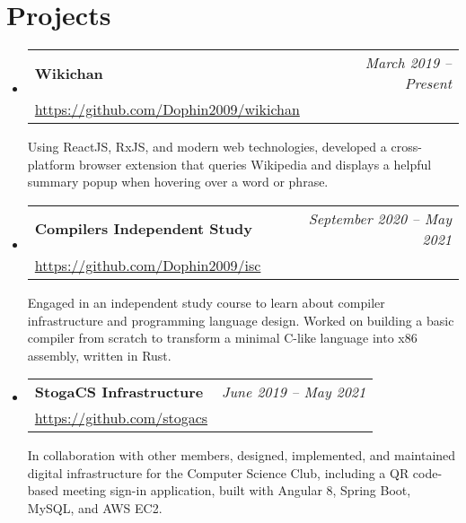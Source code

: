 \documentclass[letterpaper,11pt]{article}
\makeatletter
\newcommand{\resumeSubheading}[4]{
  \vspace{-3pt}\item
    \begin{tabular*}{0.97\textwidth}[t]{l@{\extracolsep{\fill}}r}
      \textbf{#1} & #2 \\
      {#3} & \textit{\small #4} \\[3pt]
    \end{tabular*}\vspace{-5pt}
}
\newcommand{\resumeSubheadingDescription}[1]{
  \parbox{0.97\textwidth}{#1}
}
\newenvironment{resumeSubHeadingList}{
  \begin{itemize}[leftmargin=*, label={}]
}{
  \end{itemize}
}
\makeatother
\begin{document}
\section{Projects}
  \begin{resumeSubHeadingList}
    \resumeSubheading
      {Wikichan}
      {\small\itshape March 2019 -- Present}
      {\small \url{https://github.com/Dophin2009/wikichan}}
      {}

      \resumeSubheadingDescription{
        Using ReactJS, RxJS, and modern web technologies, developed a cross-platform browser
        extension that queries Wikipedia and displays a helpful summary popup when hovering over a
        word or phrase.
      }

    \resumeSubheading
      {Compilers Independent Study}
      {\small\itshape September 2020 -- May 2021}
      {\small \url{https://github.com/Dophin2009/isc}}
      {}

      \resumeSubheadingDescription{
        Engaged in an independent study course to learn about compiler infrastructure and
        programming language design. Worked on building a basic compiler from scratch to transform a
        minimal C-like language into x86 assembly, written in Rust.
      }

    \resumeSubheading
      {StogaCS Infrastructure}
      {\small\itshape June 2019 -- May 2021}
      {\small \url{https://github.com/stogacs}}
      {}

      \resumeSubheadingDescription{
        In collaboration with other members, designed, implemented, and maintained digital
        infrastructure for the Computer Science Club, including a QR code-based meeting sign-in
        application, built with Angular 8, Spring Boot, MySQL, and AWS EC2.
      }
  \end{resumeSubHeadingList}
\end{document}
